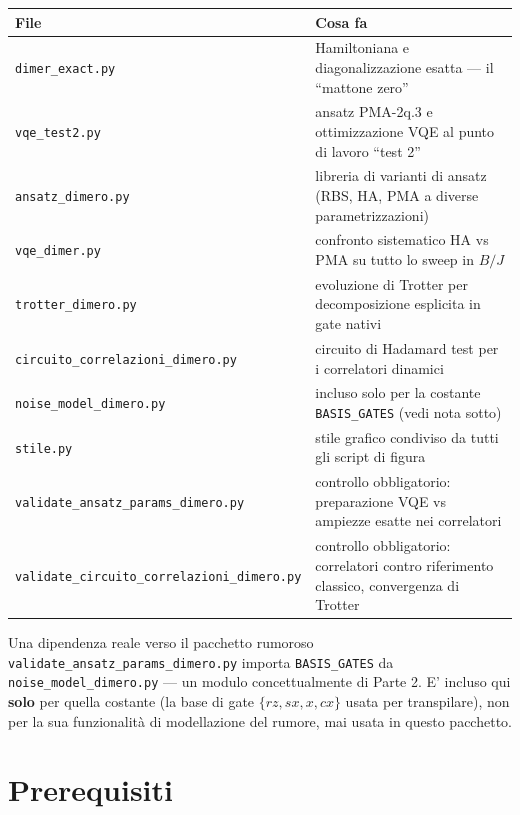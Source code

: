 \documentclass[11pt,a4paper]{article}
\newcommand{\code}[1]{\texttt{\small #1}}
\begin{document}
{\footnotesize
\begin{longtable}{@{}p{4.9cm}p{9.3cm}@{}}
\toprule
\textbf{File} & \textbf{Cosa fa} \\
\midrule
\endhead
\raggedright\code{dimer\_exact.py} & Hamiltoniana e diagonalizzazione esatta --- il ``mattone zero'' \\
\raggedright\code{vqe\_test2.py} & ansatz PMA-2q.3 e ottimizzazione VQE al punto di lavoro ``test 2'' \\
\raggedright\code{ansatz\_dimero.py} & libreria di varianti di ansatz (RBS, HA, PMA a diverse parametrizzazioni) \\
\raggedright\code{vqe\_dimer.py} & confronto sistematico HA vs PMA su tutto lo sweep in $B/J$ \\
\raggedright\code{trotter\_dimero.py} & evoluzione di Trotter per decomposizione esplicita in gate nativi \\
\raggedright\code{circuito\_correlazioni\_\allowbreak dimero.py} & circuito di Hadamard test per i correlatori dinamici \\
\raggedright\code{noise\_model\_dimero.py} & incluso solo per la costante \code{BASIS\_GATES} (vedi nota sotto) \\
\raggedright\code{stile.py} & stile grafico condiviso da tutti gli script di figura \\
\raggedright\code{validate\_ansatz\_params\_\allowbreak dimero.py} & controllo obbligatorio: preparazione VQE vs ampiezze esatte nei correlatori \\
\raggedright\code{validate\_circuito\_\allowbreak correlazioni\_dimero.py} & controllo obbligatorio: correlatori contro riferimento classico, convergenza di Trotter \\
\bottomrule
\end{longtable}
}

\begin{warnbox}{Una dipendenza reale verso il pacchetto rumoroso}
\code{validate\_ansatz\_params\_dimero.py} importa \code{BASIS\_GATES} da
\code{noise\_model\_dimero.py} --- un modulo concettualmente di Parte 2.
E' incluso qui \textbf{solo} per quella costante (la base di gate
$\{rz,sx,x,cx\}$ usata per transpilare), non per la sua funzionalità di
modellazione del rumore, mai usata in questo pacchetto.
\end{warnbox}

\section{Prerequisiti}
\end{document}
